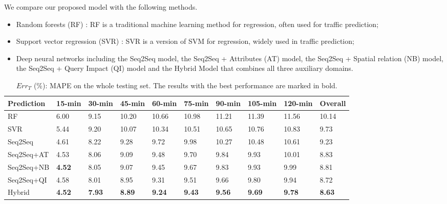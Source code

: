 We compare our proposed model with the following methods.
\begin{itemize}
\item Random forests (RF) \cite{leshem2007traffic}: RF is a traditional machine learning method for regression, often used for traffic prediction;
\item Support vector regression  (SVR) \cite{jin2007simultaneously}: SVR is a version of SVM for regression, widely used in traffic prediction;
\item Deep neural networks including the Seq2Seq model, the Seq2Seq + Attributes  (AT) model, the Seq2Seq + Spatial relation  (NB) model, the Seq2Seq + Query Impact  (QI) model and the Hybrid Model that combines all three auxiliary domains.
\end{itemize}

\begin{table*}
\caption{$Err_T$ (\%): MAPE on the whole testing set. The results with the best performance are marked in bold.}
\label{tab:cmpall}
\begin{tabular}{llllllllll}
\toprule
Prediction & 15-min & 30-min & 45-min & 60-min & 75-min & 90-min & 105-min & 120-min & Overall\\
\midrule
RF &  6.00 & 9.15 & 10.20 & 10.66 & 10.98 & 11.21 & 11.39 & 11.56 & 10.14 \\
SVR  &  5.44 & 9.20 & 10.07 & 10.34 & 10.51 & 10.65 & 10.76 & 10.83 & 9.73 \\
\midrule
Seq2Seq  & 4.61 & 8.22 & 9.28 & 9.72 & 9.98 & 10.27 & 10.48 & 10.61 & 9.23\\
Seq2Seq+AT    & 4.53 & 8.06 & 9.09 & 9.48 & 9.70 & 9.84 & 9.93 & 10.01 & 8.83\\
Seq2Seq+NB & \textbf{4.52} & 8.05 & 9.07 & 9.45 & 9.67 & 9.83 & 9.93 & 9.99 & 8.81\\
\midrule
Seq2Seq+QI   & 4.58 & 8.01 & 8.95 & 9.31 & 9.51 & 9.66 & 9.80 & 9.94 & 8.72\\
Hybrid & \textbf{4.52} & \textbf{7.93} & \textbf{8.89} & \textbf{9.24 }& \textbf{9.43} & \textbf{9.56} & \textbf{9.69} & \textbf{9.78} & \textbf{8.63}\\
\bottomrule
\end{tabular}
\end{table*}


